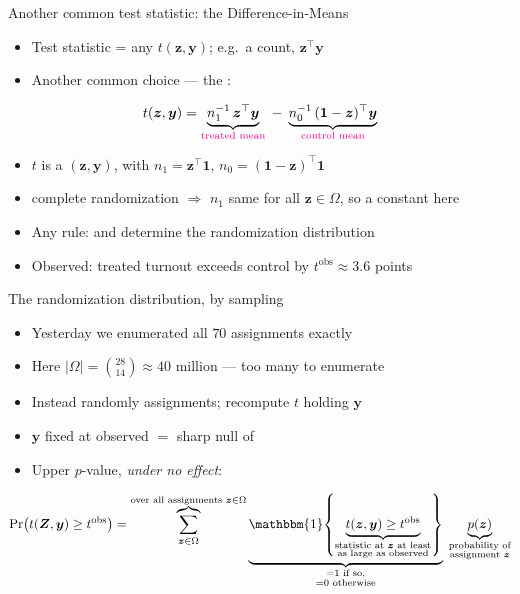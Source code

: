 \documentclass[table, xcolor = {dvipsnames}, 9pt]{beamer}
\theoremstyle{plain}
\newcommand{\mh}[1]{{\color{magenta}{#1}}}
\begin{document}
\begin{frame}[t]{Another common test statistic: the Difference-in-Means}
\vfill
\begin{itemize} \vfill
\item Test statistic = any \mh{rule} $t(\bm{z}, \bm{y})$; e.g.\ a count, $\bm{z}^{\top}\bm{y}$ \vfill
\item Another common choice --- the \mh{Difference-in-Means}: \vfill
\end{itemize} \vfill
\begin{equation*}
t(\bm{z}, \bm{y}) = \underbrace{n_1^{-1}\, \bm{z}^{\top}\bm{y}}_{\textcolor{magenta}{\text{treated mean}}} \; - \; \underbrace{n_0^{-1}\, (\bm{1} - \bm{z})^{\top}\bm{y}}_{\textcolor{magenta}{\text{control mean}}}
\end{equation*} \vfill
\begin{itemize} \vfill
\item $t$ is a \mh{function of} $(\bm{z}, \bm{y})$, with $n_1 = \bm{z}^{\top}\bm{1}$, $n_0 = (\bm{1} - \bm{z})^\top \bm{1}$ \vfill
\item[] complete randomization $\Rightarrow$ $n_1$ same for all $\bm{z} \in \Omega$, so a constant here \vfill
\item Any rule: \mh{design} and \mh{null} determine the randomization distribution \vfill
\item Observed: treated turnout exceeds control by $t^{\text{obs}} \approx 3.6$ points \vfill
\end{itemize} \vfill
\end{frame}
\begin{frame}[t]{The randomization distribution, by sampling}
\vfill
\begin{itemize} \vfill
\item Yesterday we enumerated all $70$ assignments exactly \vfill
\item Here $\lvert \Omega \rvert = \binom{28}{14} \approx 40$ million --- too many to enumerate \vfill
\item Instead randomly \mh{sample} assignments; recompute $t$ holding $\bm{y}$ \mh{fixed} \vfill
\item[] $\bm{y}$ fixed at observed $=$ sharp null of \mh{no effect} \vfill
\item Upper $p$-value, \emph{under no effect}: \vfill
\end{itemize} \vfill
\begin{equation*}
\Pr\!\left(t(\bm{Z}, \bm{y}) \geq t^{\text{obs}}\right) =
\overbrace{\sum_{\bm{z} \in \Omega}}^{\text{over all assignments } \bm{z} \in \Omega}
\underbrace{\mathbbm{1}\!\left\{\underbrace{t(\bm{z}, \bm{y}) \geq t^{\text{obs}}}_{\substack{\text{statistic at } \bm{z} \text{ at least} \\ \text{as large as observed}}}\right\}}_{\substack{=1 \text{ if so,} \\ =0 \text{ otherwise}}}
\;
\underbrace{p(\bm{z})}_{\substack{\text{probability of} \\ \text{assignment } \bm{z}}}
\end{equation*} \vfill
\end{frame}
\end{document}
